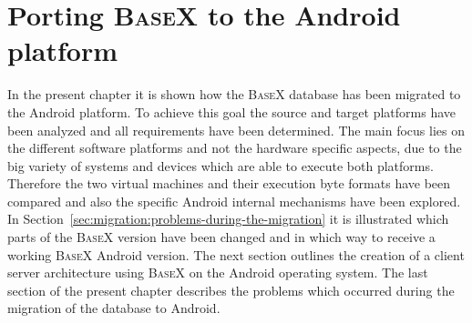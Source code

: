 \chapter{Porting \textsc{BaseX} to the Android platform}
\label{sec:migration:porting-basex-to-android}
In the present chapter it is shown how the \textsc{BaseX} database has been migrated to the Android platform.
To achieve this goal the source and target platforms have been analyzed and all requirements have been determined.
The main focus lies on the different software platforms and not the hardware specific aspects, due to the big variety of systems and devices which are able to execute both platforms. 
Therefore the two virtual machines and their execution byte formats have been compared and also the specific Android internal mechanisms have been explored.
In Section~\ref{sec:migration:problems-during-the-migration} it is illustrated which parts of the \textsc{BaseX} version have been changed and in which way to receive a working \textsc{BaseX} Android version.
The next section outlines the creation of a client server architecture using \textsc{BaseX} on the Android operating system.
The last section of the present chapter describes the problems which occurred during the migration of the database to Android.

